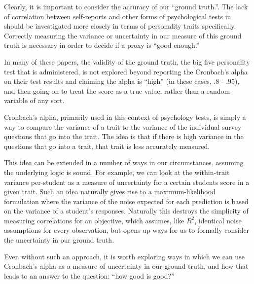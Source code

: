 \documentclass[a4paper,12pt]{article}
\begin{document}
Clearly, it is important to consider the accuracy of our ``ground truth.''. The lack of correlation between self-reports and other forms of psychological tests in \cite{Meyer2001} should be investigated more closely in terms of personality traits specifically. Correctly measuring the variance or uncertainty in our measure of this ground truth is necessary in order to decide if a proxy is ``good enough.''

In many of these papers, the validity of the ground truth, the big five personality test that is administered, is not explored beyond reporting the Cronbach's alpha on their test results and claiming the alpha is ``high'' (in these cases, .8 - .95), and then going on to treat the score as a true value, rather than a random variable of any sort.

Cronbach's alpha, primarily used in this context of psychology tests, is simply a way to compare the variance of a trait to the variance of the individual survey questions that go into the trait. The idea is that if there is high variance in the questions that go into a trait, that trait is less accurately measured.

This idea can be extended in a number of ways in our circumstances, assuming the underlying logic is sound. For example, we can look at the within-trait variance per-student as a measure of uncertainty for a certain students score in a given trait. Such an idea naturally gives rise to a maximum-likelihood formulation where the variance of the noise expected for each prediction is based on the variance of a student's responses. Naturally this destroys the simplicity of measuring correlations for an objective, which assumes, like $R^2$, identical noise assumptions for every observation, but opens up ways for us to formally consider the uncertainty in our ground truth.

Even without such an approach, it is worth exploring ways in which we can use Cronbach's alpha as a measure of uncertainty in our ground truth, and how that leads to an answer to the question: ``how good is good?''

\printbibliography
\end{document}
